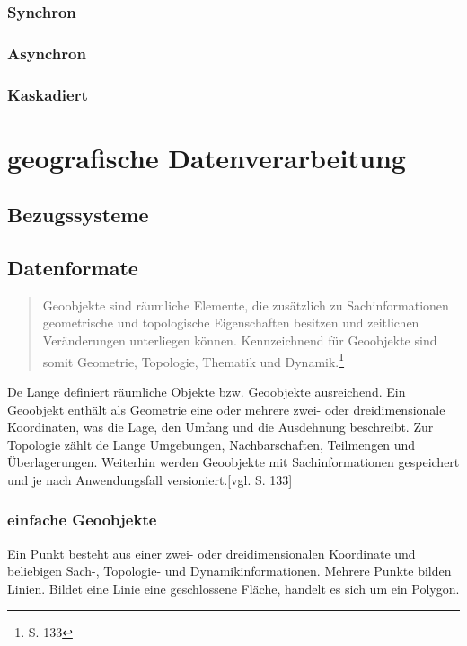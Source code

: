 \subsubsection{Synchron}

\subsubsection{Asynchron}

\subsubsection{Kaskadiert}

\newpage

\section{geografische Datenverarbeitung}

\subsection{Bezugssysteme}

\subsection{Datenformate}


\begin{quote}
Geoobjekte sind räumliche Elemente, die zusätzlich zu Sachinformationen geometrische und topologische Eigenschaften besitzen und zeitlichen Veränderungen unterliegen können. Kennzeichnend für Geoobjekte sind somit Geometrie, Topologie, Thematik und Dynamik.\footnote{\cite{book:gi-theopluspraxis3} S. 133}
\end{quote}
De Lange definiert räumliche Objekte bzw. Geoobjekte ausreichend.
Ein Geoobjekt enthält als Geometrie eine oder mehrere zwei- oder dreidimensionale Koordinaten, was die Lage, den Umfang und die Ausdehnung beschreibt.
Zur Topologie zählt de Lange Umgebungen, Nachbarschaften, Teilmengen und Überlagerungen.
Weiterhin werden Geoobjekte mit Sachinformationen gespeichert und je nach Anwendungsfall versioniert.[vgl. \cite{book:gi-theopluspraxis3} S. 133]


\subsubsection{einfache Geoobjekte}

Ein Punkt besteht aus einer zwei- oder dreidimensionalen Koordinate und beliebigen Sach-, Topologie- und Dynamikinformationen.
Mehrere Punkte bilden Linien.
Bildet eine Linie eine geschlossene Fläche, handelt es sich um ein Polygon.

